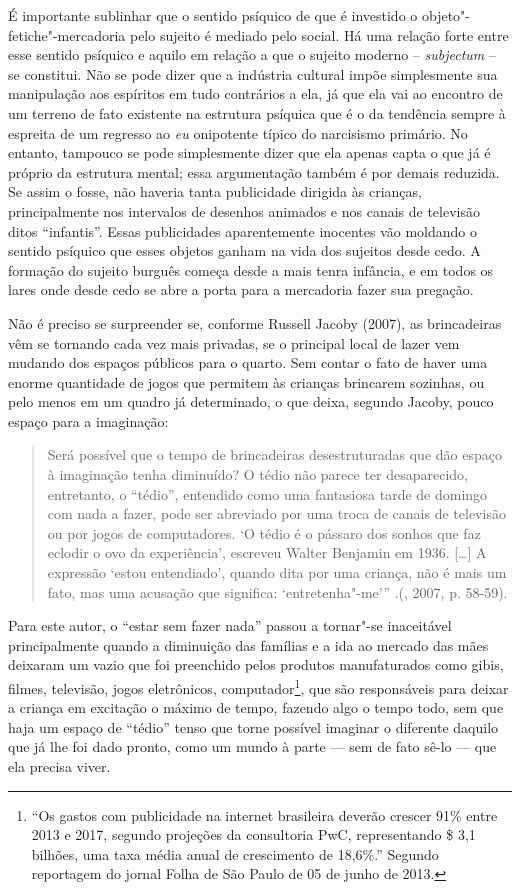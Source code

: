 É importante sublinhar que o sentido psíquico de que é investido o
objeto"-fetiche"-mercadoria pelo sujeito é mediado pelo social. Há uma
relação forte entre esse sentido psíquico e aquilo em relação a que o
sujeito moderno -- \emph{subjectum} -- se constitui. Não se pode dizer
que a indústria cultural impõe simplesmente sua manipulação aos
espíritos em tudo contrários a ela, já que ela vai ao encontro de um
terreno de fato existente na estrutura psíquica que é o da tendência
sempre à espreita de um regresso ao \emph{eu} onipotente típico do
narcisismo primário. No entanto, tampouco se pode simplesmente dizer que
ela apenas capta o que já é próprio da estrutura mental; essa
argumentação também é por demais reduzida. Se assim o fosse, não haveria
tanta publicidade dirigida às crianças, principalmente nos intervalos de
desenhos animados e nos canais de televisão ditos ``infantis''. Essas
publicidades aparentemente inocentes vão moldando o sentido psíquico que
esses objetos ganham na vida dos sujeitos desde cedo. A formação do
sujeito burguês começa desde a mais tenra infância, e em todos os lares
onde desde cedo se abre a porta para a mercadoria fazer sua pregação.

Não é preciso se surpreender se, conforme Russell Jacoby (2007), as
brincadeiras vêm se tornando cada vez mais privadas, se o principal
local de lazer vem mudando dos espaços públicos para o quarto. Sem
contar o fato de haver uma enorme quantidade de jogos que permitem às
crianças brincarem sozinhas, ou pelo menos em um quadro já determinado,
o que deixa, segundo Jacoby, pouco espaço para a imaginação:

\begin{quote}
Será possível que o tempo de brincadeiras desestruturadas que dão espaço
à imaginação tenha diminuído? O tédio não parece ter desaparecido,
entretanto, o ``tédio'', entendido como uma fantasiosa tarde de domingo
com nada a fazer, pode ser abreviado por uma troca de canais de
televisão ou por jogos de computadores. `O tédio é o pássaro dos sonhos
que faz eclodir o ovo da experiência', escreveu Walter Benjamin em 1936.
[\ldots{}] A expressão `estou entendiado', quando dita por uma criança,
não é mais um fato, mas uma acusação que significa: `entretenha"-me'''
.(, 2007, p. 58-59).
\end{quote}

Para este autor, o ``estar sem fazer nada'' passou a tornar"-se
inaceitável principalmente quando a diminuição das famílias e a ida ao
mercado das mães deixaram um vazio que foi preenchido pelos produtos
manufaturados como gibis, filmes, televisão, jogos eletrônicos,
computador\footnote{``Os gastos com publicidade na internet brasileira
  deverão crescer 91\% entre 2013 e 2017, segundo projeções da
  consultoria PwC, representando \$ 3,1 bilhões, uma taxa média anual
  de crescimento de 18,6\%.'' Segundo reportagem do jornal Folha de São
  Paulo de 05 de junho de 2013.}, que são responsáveis para deixar a
criança em excitação o máximo de tempo, fazendo algo o tempo todo, sem
que haja um espaço de ``tédio'' tenso que torne possível imaginar o
diferente daquilo que já lhe foi dado pronto, como um mundo à parte ---
sem de fato sê-lo --- que ela precisa viver.

